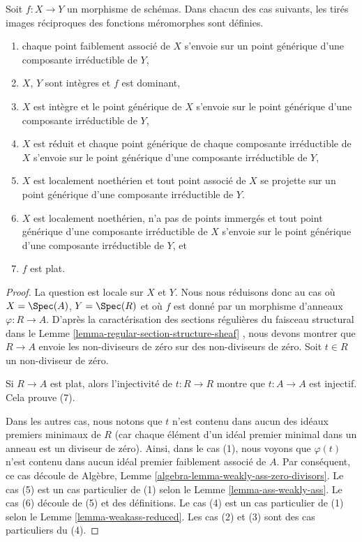 \begin{lemma}
\label{lemma-pullback-meromorphic-sections-defined}
Soit  $f : X \to Y$  un morphisme de schémas. Dans chacun des cas suivants, les tirés
images réciproques des fonctions méromorphes sont définies.
\begin{enumerate}
\item chaque point faiblement associé de  $X$  s'envoie sur un point générique
d'une composante irréductible de  $Y$,
\item $X$,  $Y$  sont intègres et  $f$  est dominant,
\item $X$  est intègre et le point générique de  $X$  s'envoie sur le
point générique d'une composante irréductible de  $Y$,
\item $X$  est réduit et chaque point générique de chaque composante
irréductible de  $X$  s'envoie sur le point générique d'une composante
irréductible de  $Y$,
\item $X$  est localement noethérien et tout point associé de  $X$  se
projette sur un point générique d'une composante irréductible de  $Y$.
\item $X$  est localement noethérien, n'a pas de points immergés et tout point
générique d'une composante irréductible de  $X$  s'envoie sur le point
générique d'une composante irréductible de  $Y$, et
\item $f$  est plat.
\end{enumerate}
\end{lemma}

\begin{proof}
La question est locale sur  $X$  et  $Y$. Nous nous réduisons donc
au cas où  $X = \Spec(A)$,  $Y = \Spec(R)$  et où  $f$  est donné par un morphisme
d'anneaux  $\varphi : R \to A$. D'après la caractérisation des sections régulières du
faisceau structural dans le Lemme  \ref{lemma-regular-section-structure-sheaf} , nous devons montrer que
 $R \to A$  envoie les non-diviseurs de zéro sur des non-diviseurs de zéro. Soit
 $t \in R$  un non-diviseur de zéro.

\medskip\noindent
Si  $R \to A$  est plat, alors l'injectivité de  $t : R \to R$  montre que
 $t : A \to A$  est injectif. Cela prouve (7).

\medskip\noindent
Dans les autres cas, nous notons que  $t$  n'est contenu dans aucun des
idéaux premiers minimaux de  $R$  (car chaque élément d'un idéal premier
minimal dans un anneau est un diviseur de zéro). Ainsi, dans le cas (1), nous
voyons que  $\varphi(t)$  n'est contenu dans aucun idéal premier faiblement
associé de  $A$. Par conséquent, ce cas découle de Algèbre, Lemme
 \ref{algebra-lemma-weakly-ass-zero-divisors}. Le cas (5) est un cas particulier de (1) selon le Lemme
 \ref{lemma-ass-weakly-ass}. Le cas (6) découle de (5) et des définitions. Le cas (4) est un cas
particulier de (1) selon le Lemme  \ref{lemma-weakass-reduced}. Les cas (2) et (3) sont des cas
particuliers du (4).
\end{proof}


